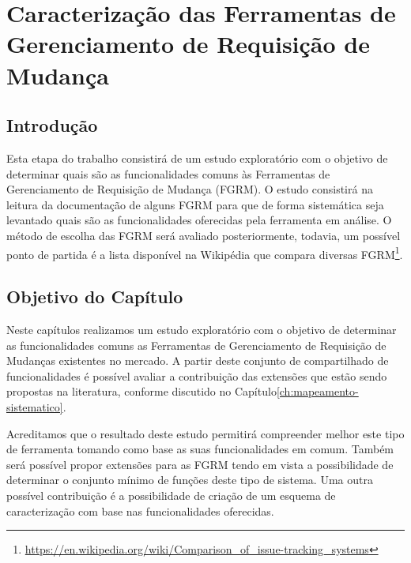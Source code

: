 \chapter{Caracterização das Ferramentas de Gerenciamento de Requisição de Mudança}
\label{ch:caracterizacao}


\section{Introdução}

Esta etapa do trabalho consistirá de um estudo exploratório com o objetivo de determinar quais são as funcionalidades comuns às Ferramentas de Gerenciamento de Requisição de Mudança (FGRM). O estudo consistirá na leitura da documentação de alguns FGRM para que de forma sistemática seja levantado quais são as funcionalidades oferecidas pela ferramenta em análise. O método de escolha das FGRM será avaliado posteriormente, todavia, um possível ponto de partida é a lista disponível na Wikipédia que compara diversas FGRM\footnote{\url{https://en.wikipedia.org/wiki/Comparison_of_issue-tracking_systems}}.

\section{Objetivo do Capítulo}
\label{sec:objetivo_do_capítulo}

Neste capítulos realizamos um estudo exploratório com o objetivo de determinar as
funcionalidades comuns as Ferramentas de Gerenciamento de Requisição de Mudanças existentes no
mercado. A partir deste conjunto de compartilhado de funcionalidades é possível avaliar a
contribuição das extensões que estão sendo propostas na literatura, conforme discutido no
Capítulo\ref{ch:mapeamento-sistematico}.

Acreditamos que o resultado deste estudo permitirá compreender melhor este tipo de ferramenta tomando como base as
suas funcionalidades em comum. Também será possível propor extensões para as FGRM tendo em vista a
possibilidade de determinar o conjunto mínimo de funções deste tipo de sistema. Uma outra possível
contribuição é a possibilidade de criação de um esquema de caracterização com base nas funcionalidades oferecidas.

